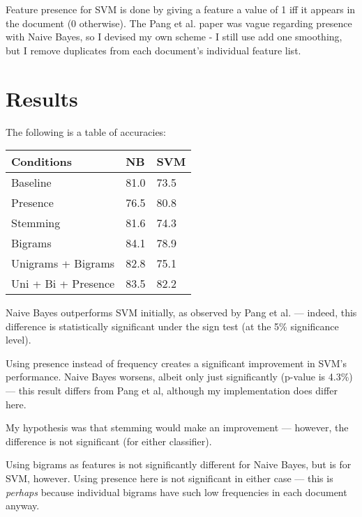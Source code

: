 \documentclass[12pt,a4paper,twoside]{article}
\begin{document}
Feature presence for SVM is done by giving a feature a value of 1 iff it appears in the document (0 otherwise). The Pang et al. paper was vague regarding presence with Naive Bayes, so I devised my own scheme - I still use add one smoothing, but I remove duplicates from each document's individual feature list.


\section{Results}

The following is a table of accuracies:

\vspace{16px}

\begin{center}
\begin{tabular}{|l|l|l|}
\hline
\textbf{Conditions} & \textbf{NB} & \textbf{SVM} \\ \hline
Baseline & 81.0 & 73.5 \\ \hline
Presence & 76.5 & 80.8 \\ \hline
Stemming & 81.6 & 74.3 \\ \hline
Bigrams & 84.1 & 78.9 \\ \hline
Unigrams + Bigrams & 82.8 & 75.1 \\ \hline
Uni + Bi + Presence & 83.5 & 82.2 \\ \hline
\end{tabular}
\end{center}

\vspace{16px}

Naive Bayes outperforms SVM initially, as observed by Pang et al. --- indeed, this difference is statistically significant under the sign test (at the 5\% significance level).

Using presence instead of frequency creates a significant improvement in SVM's performance. Naive Bayes worsens, albeit only just significantly (p-value is 4.3\%) --- this result differs from Pang et al, although my implementation does differ here.

My hypothesis was that stemming would make an improvement --- however, the difference is not significant (for either classifier).

Using bigrams as features is not significantly different for Naive Bayes, but is for SVM, however. Using presence here is not significant in either case --- this is \textit{perhaps} because individual bigrams have such low frequencies in each document anyway.
\end{document}
